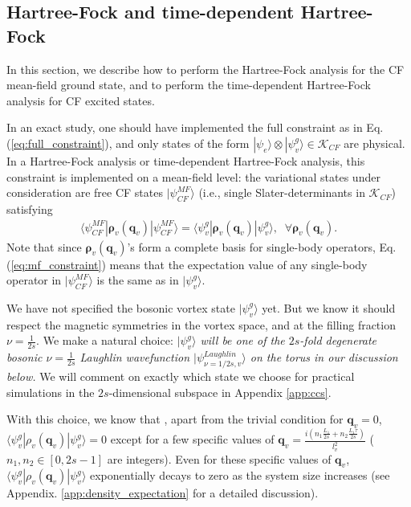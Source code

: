 \subsection{Hartree-Fock and time-dependent Hartree-Fock}\label{sec:HF_TDHF}
In this section, we describe how to perform the Hartree-Fock analysis for the CF mean-field ground state, and to perform the time-dependent Hartree-Fock analysis for CF excited states.

In an exact study, one should have implemented the full constraint as in Eq.(\ref{eq:full_constraint}), and only states of the form $|\psi_e\rangle \otimes|\psi_v^g\rangle\in \mathcal K_{CF}$ are physical. In a Hartree-Fock analysis or time-dependent Hartree-Fock analysis, this constraint is implemented on a mean-field level: the variational states under consideration are free CF states $|\psi^{MF}_{CF}\rangle$ (i.e., single Slater-determinants in $\mathcal K_{CF}$) satisfying
\begin{align}
    \langle \psi^{MF}_{CF}|\pmb{\boldsymbol\rho}_v(\mathbf q_v)|\psi^{MF}_{CF}\rangle=\langle\psi^g_v|\pmb{\boldsymbol\rho}_v(\mathbf q_v)|\psi^g_v\rangle,\;\; \forall \pmb{\boldsymbol\rho}_v(\mathbf q_v).\label{eq:mf_constraint}
\end{align}
Note that since $\pmb{\boldsymbol\rho}_v(\mathbf q_v)$'s form a complete basis for single-body operators, Eq.(\ref{eq:mf_constraint}) means that the expectation value of any single-body operator in
$|\psi^{MF}_{CF}\rangle$ is the same as in $|\psi_v^g\rangle$.

We have not specified the bosonic vortex state $|\psi^g_v\rangle$ yet. But we know it should respect the magnetic symmetries in the vortex space, and at the filling fraction $\nu=\frac{1}{2s}$. We make a natural choice: \emph{$|\psi^g_v\rangle$ will be one of the $2s$-fold degenerate bosonic $\nu=\frac{1}{2s}$ Laughlin wavefunction $|\psi^{Laughlin}_{\nu=1/2s,v}\rangle$ on the torus in our discussion below.} We will comment on exactly which state we choose for practical simulations in the $2s$-dimensional subspace in Appendix \ref{app:ccs}.

With this choice, we know that \cite{wen1990ground}, apart from the trivial condition for $\mathbf{q}_v=0$, $\langle\psi^g_v|\rho_v(\mathbf q_v)|\psi^g_v\rangle=0$ except for a few specific values of $\mathbf q_v=\frac{i (n_1 \frac{L_1}{2s}+ n_2\frac{L_1\tau}{2s})}{l_v^2}$ ($n_1,n_2\in [0,2s-1]$ are integers). Even for these specific values of $\mathbf q_v$, $\langle\psi^g_v|\rho_v(\mathbf q_v)|\psi^g_v\rangle$ exponentially decays to zero as the system size increases (see Appendix. \ref{app:density_expectation} for a detailed discussion).

